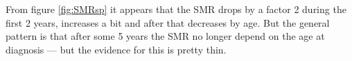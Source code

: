 \begin{enumerate}[resume]
From figure \ref{fig:SMRsp} it appears that the SMR drops by a factor
2 during the first 2 years, increases a bit and after that decreases
by age. But the general pattern is that after some 5 years the SMR no
longer depend on the age at diagnosis --- but the evidence for this is
pretty thin.

\end{enumerate}

